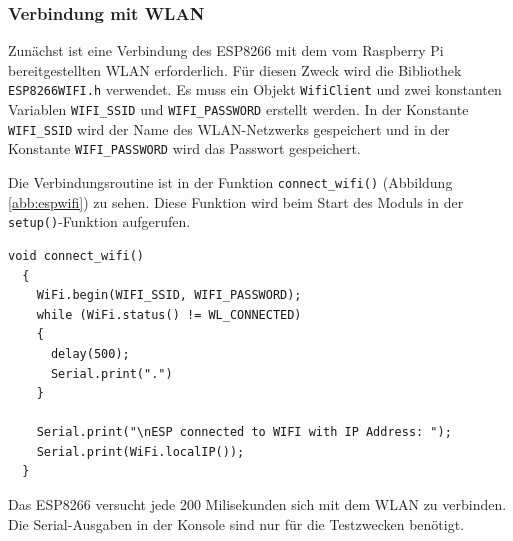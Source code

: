 \documentclass[12pt, letterpaper]{article}
\begin{document}
\subsubsection{Verbindung mit WLAN}
\par Zunächst ist eine Verbindung des ESP8266 mit dem vom Raspberry Pi bereitgestellten WLAN erforderlich. Für diesen Zweck wird die Bibliothek \texttt{ESP8266WIFI.h} verwendet. Es muss ein Objekt \texttt{WifiClient} und zwei konstanten Variablen \texttt{WIFI\_SSID} und \texttt{WIFI\_PASSWORD} erstellt werden. In der Konstante \texttt{WIFI\_SSID} wird der Name des WLAN-Netzwerks gespeichert und in der Konstante \texttt{WIFI\_PASSWORD} wird das Passwort gespeichert.
\par Die Verbindungsroutine ist in der Funktion \texttt{connect\_wifi()} (Abbildung \ref{abb:espwifi}) zu sehen. Diese Funktion wird beim Start des Moduls in der \texttt{setup()}-Funktion aufgerufen.
\begin{Verbatim}[frame=single]
  void connect_wifi()
  {
    WiFi.begin(WIFI_SSID, WIFI_PASSWORD);
    while (WiFi.status() != WL_CONNECTED)
    {
      delay(500);
      Serial.print(".")
    }

    Serial.print("\nESP connected to WIFI with IP Address: ");
    Serial.print(WiFi.localIP());
  }
\end{Verbatim}
\par Das ESP8266 versucht jede 200 Milisekunden sich mit dem WLAN zu verbinden. Die Serial-Ausgaben in der Konsole sind nur für die Testzwecken benötigt. 
\end{document}
